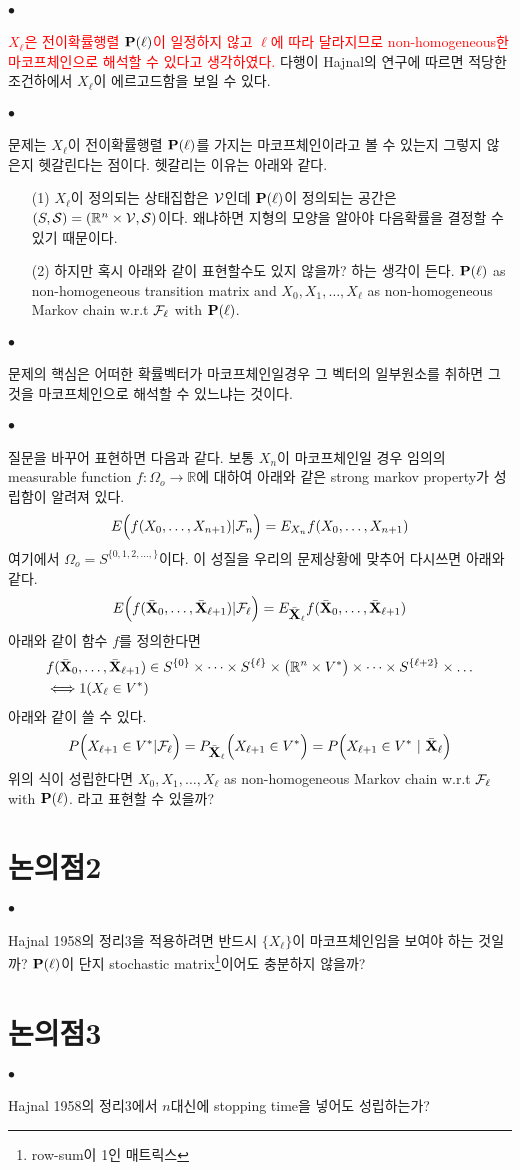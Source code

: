 \documentclass[12pt,oneside,english,a4paper]{article}
\def\ck{\paragraph{\large$\bullet$}\large}
\newcommand{\bfP}{\mbox{$\bf{P}$}}
\newcommand{\bfX}{\mbox{$\bf{X}$}}
\begin{document}
\ck \textcolor{red}{$X_\ell$은 전이확률행렬 $\bfP(\ell)$이 일정하지 않고 $\ell$에 따라 달라지므로 non-homogeneous한 마코프체인으로 해석할 수 있다고 생각하였다.} 다행이 Hajnal의 연구에 따르면 적당한 조건하에서 $X_\ell$이 에르고드함을 보일 수 있다. 

\ck 문제는 $X_\ell$이 전이확률행렬 $\bfP(\ell)$를 가지는 마코프체인이라고 볼 수 있는지 그렇지 않은지 헷갈린다는 점이다. 헷갈리는 이유는 아래와 같다. 
\begin{itemize}
	\item[(1)] $X_\ell$이 정의되는 상태집합은 ${\cal V}$인데 $\bfP(\ell)$이 정의되는 공간은 $(S,{\cal S})=(\mathbb{R}^n\times {\cal V}, {\cal S})$이다. 왜냐하면 지형의 모양을 알아야 다음확률을 결정할 수 있기 때문이다. 
	\item[(2)] 하지만 혹시 아래와 같이 표현할수도 있지 않을까? 하는 생각이 든다. \newline\newline
	$\bfP(\ell)$ as non-homogeneous transition matrix and $X_0,X_1,\dots,X_\ell$ as non-homogeneous Markov chain w.r.t ${\cal F}_\ell$ with $\bfP(\ell)$.
\end{itemize}

\ck 문제의 핵심은 어떠한 확률벡터가 마코프체인일경우 그 벡터의 일부원소를 취하면 그것을 마코프체인으로 해석할 수 있느냐는 것이다. 

\ck 질문을 바꾸어 표현하면 다음과 같다. 보통 $X_n$이 마코프체인일 경우 임의의 measurable function $f:\Omega_o \to \mathbb{R}$에 대하여 아래와 같은 strong markov property가 성립함이 알려져 있다. 
\[
E\Big({f(X_0,\dots,X_{n+1})} | {\cal F}_n \Big)=E_{X_n}f(X_0,\dots,X_{n+1})
\]
여기에서 $\Omega_o=S^{\{0,1,2,\dots,\}}$이다. 
이 성질을 우리의 문제상황에 맞추어 다시쓰면 아래와 같다. 
\[
E\Big({f(\bar{\bfX}_0,\dots,\bar{\bfX}_{\ell+1})} | {\cal F}_\ell \Big)=E_{\bar{\bfX}_\ell}f(\bar{\bfX}_0,\dots,\bar{\bfX}_{\ell+1})
\]
아래와 같이 함수 $f$를 정의한다면 
\begin{align*}
& f(\bar{\bfX}_0,\dots,\bar{\bfX}_{\ell+1}) \in S^{\{0\}} \times \dots \times S^{\{\ell\}} \times \big(\mathbb{R}^n \times V^*\big) \times \dots \times S^{\{\ell+2\}}\times \dots  \\ 
& \Longleftrightarrow 1(X_\ell\in V^*)
\end{align*}
아래와 같이 쓸 수 있다. 
\[
P\Big(X_{\ell+1} \in V^*| {\cal F}_\ell \Big)=P_{\bar{\bfX}_\ell}\Big(X_{\ell+1}\in V^*\Big)= P\Big(X_{\ell+1}\in V^* ~|~ {\bar{\bfX}_\ell}\Big)
\]
위의 식이 성립한다면 
\newline\newline
$X_0,X_1,\dots,X_\ell$ as non-homogeneous Markov chain w.r.t ${\cal F}_\ell$ with $\bfP(\ell)$.
\newline\newline
라고 표현할 수 있을까? 

\section{논의점2}
\ck Hajnal 1958의 정리3을 적용하려면 반드시 $\{X_\ell\}$이 마코프체인임을 보여야 하는 것일까? $\bfP(\ell)$이 단지 stochastic matrix\footnote{row-sum이 1인 매트릭스}이어도 충분하지 않을까? 

\section{논의점3}
\ck Hajnal 1958의 정리3에서 $n$대신에 stopping time을 넣어도 성립하는가? 
\end{document}
